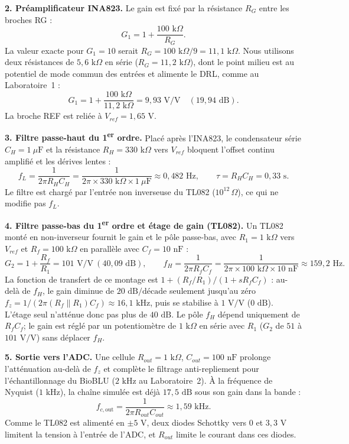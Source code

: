 \documentclass[11pt,letterpaper]{article}
\begin{document}
\textbf{2. Préamplificateur INA823.}
Le gain est fixé par la résistance $R_G$ entre les broches RG :
\[
G_1 = 1 + \frac{100\text{ k}\Omega}{R_G}.
\]
La valeur exacte pour $G_1 = 10$ serait $R_G = 100\text{ k}\Omega / 9 = 11,1\text{ k}\Omega$. Nous utilisons deux résistances de $5,6\text{ k}\Omega$ en série ($R_G = 11,2\text{ k}\Omega$), dont le point milieu est au potentiel de mode commun des entrées et alimente le DRL, comme au Laboratoire~1 :
\[
G_1 = 1 + \frac{100\text{ k}\Omega}{11,2\text{ k}\Omega} = 9,93\text{ V/V} \quad (19,94\text{ dB}).
\]
La broche REF est reliée à $V_{ref} = 1,65\text{ V}$.

\textbf{3. Filtre passe-haut du 1\textsuperscript{er} ordre.}
Placé après l'INA823, le condensateur série $C_H = 1\ \mu\text{F}$ et la résistance $R_H = 330\text{ k}\Omega$ vers $V_{ref}$ bloquent l'offset continu amplifié et les dérives lentes :
\[
f_L = \frac{1}{2\pi R_H C_H} = \frac{1}{2\pi \times 330\text{ k}\Omega \times 1\ \mu\text{F}} \approx 0,482\text{ Hz}, \qquad \tau = R_H C_H = 0,33\text{ s}.
\]
Le filtre est chargé par l'entrée non inverseuse du TL082 ($10^{12}\,\Omega$), ce qui ne modifie pas $f_L$.

\textbf{4. Filtre passe-bas du 1\textsuperscript{er} ordre et étage de gain (TL082).}
Un TL082 monté en non-inverseur fournit le gain et le pôle passe-bas, avec $R_1 = 1\text{ k}\Omega$ vers $V_{ref}$ et $R_f = 100\text{ k}\Omega$ en parallèle avec $C_f = 10\text{ nF}$ :
\[
G_2 = 1 + \frac{R_f}{R_1} = 101\text{ V/V} \ (40,09\text{ dB}), \qquad f_H = \frac{1}{2\pi R_f C_f} = \frac{1}{2\pi \times 100\text{ k}\Omega \times 10\text{ nF}} \approx 159,2\text{ Hz}.
\]
La fonction de transfert de ce montage est $1 + (R_f/R_1)/(1 + sR_fC_f)$ : au-delà de $f_H$, le gain diminue de $20\text{ dB/décade}$ seulement jusqu'au zéro $f_z = 1/(2\pi (R_f \parallel R_1) C_f) \approx 16,1\text{ kHz}$, puis se stabilise à $1\text{ V/V}$ ($0\text{ dB}$). L'étage seul n'atténue donc pas plus de $40\text{ dB}$. Le pôle $f_H$ dépend uniquement de $R_f C_f$; le gain est réglé par un potentiomètre de $1\text{ k}\Omega$ en série avec $R_1$ ($G_2$ de $51$ à $101\text{ V/V}$) sans déplacer $f_H$.

\textbf{5. Sortie vers l'ADC.}
Une cellule $R_{out} = 1\text{ k}\Omega$, $C_{out} = 100\text{ nF}$ prolonge l'atténuation au-delà de $f_z$ et complète le filtrage anti-repliement pour l'échantillonnage du BioBLU ($2\text{ kHz}$ au Laboratoire~2). À la fréquence de Nyquist ($1\text{ kHz}$), la chaîne simulée est déjà $17,5\text{ dB}$ sous son gain dans la bande :
\[
f_{c,\text{out}} = \frac{1}{2\pi R_{out} C_{out}} \approx 1,59\text{ kHz}.
\]
Comme le TL082 est alimenté en $\pm 5\text{ V}$, deux diodes Schottky vers $0$ et $3,3\text{ V}$ limitent la tension à l'entrée de l'ADC, et $R_{out}$ limite le courant dans ces diodes.
\end{document}
